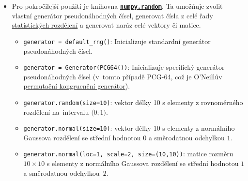 \documentclass[a4paper,11pt,twoside]{article}
\def\code#1{\textnormal{\texttt{#1}}}
\def\file#1{\textnormal{\textbf{\texttt{#1}}}}
\theoremstyle{red}
\theoremstyle{green}
\begin{document}
\begin{itemize}
        \item 
            Pro pokročilejší použití je knihovna \file{\href{https://numpy.org/doc/stable/reference/random/index.html}{numpy.random}}.
            Ta umožňuje zvolit vlastní generátor pseudonáhodných čísel, generovat čísla z celé řady \href{https://numpy.org/doc/stable/reference/random/generator.html}{statistických rozdělení} a generovat naráz celé vektory či matice.
            \begin{itemize}
                \item \code{generator = default_rng()}: Inicializuje standardní generátor pseudonáhodných čísel.
                \item \code{generator = Generator(PCG64())}: Inicializuje specifický generátor pseudonáhodných čísel (v~tomto případě PCG-64, což je O'Neillův \href{https://en.wikipedia.org/wiki/Permuted_congruential_generator}{permutační kongruenční generátor}).
                \item \code{generator.random(size=10)}: vektor délky 10 s elementy z rovnoměrného rozdělení na~intervalu $\langle 0;1)$.
                \item \code{generator.normal(size=10)}: vektor délky 10 s elementy z normálního Gaussova rozdělení se střední hodnotou $0$ a směrodatnou odchylkou $1$.
                \item \code{generator.normal(loc=1, scale=2, size=(10,10))}: matice rozměru $10\times10$ s elementy z normálního Gaussova rozdělení se střední hodnotou $1$ a směrodatnou odchylkou~$2$.
            \end{itemize}            
    \end{itemize}
\end{document}
